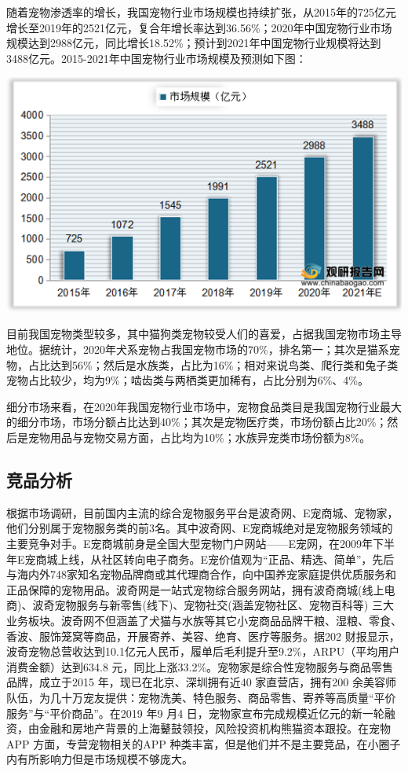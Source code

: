 \documentclass[a4paper]{ctexart}
\begin{document}
随着宠物渗透率的增长，我国宠物行业市场规模也持续扩张，从2015年的725亿元增长至2019年的2521亿元，复合年增长率达到36.56\%；2020年中国宠物行业市场规模达到2988亿元，同比增长18.52\%；预计到2021年中国宠物行业规模将达到3488亿元。2015-2021年中国宠物行业市场规模及预测如下图：

\begin{center}
  \includegraphics[scale=0.7]{494ac775492f4082a7531cfe9afdc63c.png}
\end{center}

目前我国宠物类型较多，其中猫狗类宠物较受人们的喜爱，占据我国宠物市场主导地位。据统计，2020年犬系宠物占我国宠物市场的70\%，排名第一；其次是猫系宠物，占比达到56\%；然后是水族类，占比为16\%；相对来说鸟类、爬行类和兔子类宠物占比较少，均为9\%；啮齿类与两栖类更加稀有，占比分别为6\%、4\%。

细分市场来看，在2020年我国宠物行业市场中，宠物食品类目是我国宠物行业最大的细分市场，市场分额占比达到40\%；其次是宠物医疗类，市场份额占比20\%；然后是宠物用品与宠物交易方面，占比均为10\%；水族异宠类市场份额为8\%。

\subsection{竞品分析}
根据市场调研，目前国内主流的综合宠物服务平台是波奇网、E宠商城、宠物家，他们分别属于宠物服务类的前3名。其中波奇网、E宠商城绝对是宠物服务领域的主要竞争对手。E宠商城前身是全国大型宠物门户网站——E宠网，在2009年下半年E宠商城上线，从社区转向电子商务。E宠价值观为“正品、精选、简单”，先后与海内外748家知名宠物品牌商或其代理商合作，向中国养宠家庭提供优质服务和正品保障的宠物用品。波奇网是一站式宠物综合服务网站，拥有波奇商城(线上电商)、波奇宠物服务与新零售(线下)、宠物社交(涵盖宠物社区、宠物百科等) 三大业务板块。波奇网不但涵盖了犬猫与水族等其它小宠商品品牌干粮、湿粮、零食、香波、服饰笼窝等商品，开展寄养、美容、绝育、医疗等服务。据202 财报显示，波奇宠物总营收达到10.1亿元人民币，履单后毛利提升至9.2\%，ARPU（平均用户消费金额）达到634.8 元，同比上涨33.2\%。宠物家是综合性宠物服务与商品零售品牌，成立于2015 年，现已在北京、深圳拥有近40 家直营店，拥有200 余美容师队伍，为几十万宠友提供：宠物洗美、特色服务、商品零售、寄养等高质量“平价服务”与“平价商品”。在2019 年9 月4 日，宠物家宣布完成规模近亿元的新一轮融资，由金融和房地产背景的上海鼙鼓领投，风险投资机构熊猫资本跟投。在宠物APP 方面，专营宠物相关的APP 种类丰富，但是他们并不是主要竞品，在小圈子内有所影响力但是市场规模不够庞大。
\end{document}
